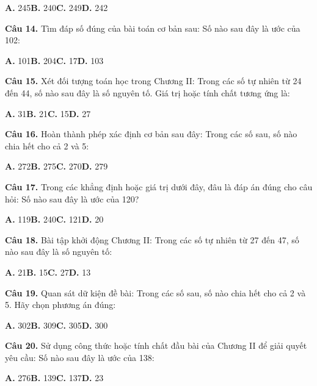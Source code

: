 \documentclass[11pt,a4paper]{article}
\begin{document}
\hspace*{1.5em}\textbf{A.} 245\quad\quad \textbf{B.} 240\quad\quad \textbf{C.} 249\quad\quad \textbf{D.} 242\par\vspace{2pt}
\textbf{\color{primary} Câu 14.} Tìm đáp số đúng của bài toán cơ bản sau: Số nào sau đây là ước của 102:\par
\hspace*{1.5em}\textbf{A.} 101\quad\quad \textbf{B.} 204\quad\quad \textbf{C.} 17\quad\quad \textbf{D.} 103\par\vspace{2pt}
\textbf{\color{primary} Câu 15.} Xét đối tượng toán học trong Chương II: Trong các số tự nhiên từ 24 đến 44, số nào sau đây là số nguyên tố. Giá trị hoặc tính chất tương ứng là:\par
\hspace*{1.5em}\textbf{A.} 31\quad\quad \textbf{B.} 21\quad\quad \textbf{C.} 15\quad\quad \textbf{D.} 27\par\vspace{2pt}
\textbf{\color{primary} Câu 16.} Hoàn thành phép xác định cơ bản sau đây: Trong các số sau, số nào chia hết cho cả 2 và 5:\par
\hspace*{1.5em}\textbf{A.} 272\quad\quad \textbf{B.} 275\quad\quad \textbf{C.} 270\quad\quad \textbf{D.} 279\par\vspace{2pt}
\textbf{\color{primary} Câu 17.} Trong các khẳng định hoặc giá trị dưới đây, đâu là đáp án đúng cho câu hỏi: Số nào sau đây là ước của 120?\par
\hspace*{1.5em}\textbf{A.} 119\quad\quad \textbf{B.} 240\quad\quad \textbf{C.} 121\quad\quad \textbf{D.} 20\par\vspace{2pt}
\textbf{\color{primary} Câu 18.} Bài tập khởi động Chương II: Trong các số tự nhiên từ 27 đến 47, số nào sau đây là số nguyên tố:\par
\hspace*{1.5em}\textbf{A.} 21\quad\quad \textbf{B.} 15\quad\quad \textbf{C.} 27\quad\quad \textbf{D.} 13\par\vspace{2pt}
\textbf{\color{primary} Câu 19.} Quan sát dữ kiện đề bài: Trong các số sau, số nào chia hết cho cả 2 và 5. Hãy chọn phương án đúng:\par
\hspace*{1.5em}\textbf{A.} 302\quad\quad \textbf{B.} 309\quad\quad \textbf{C.} 305\quad\quad \textbf{D.} 300\par\vspace{2pt}
\textbf{\color{primary} Câu 20.} Sử dụng công thức hoặc tính chất đầu bài của Chương II để giải quyết yêu cầu: Số nào sau đây là ước của 138:\par
\hspace*{1.5em}\textbf{A.} 276\quad\quad \textbf{B.} 139\quad\quad \textbf{C.} 137\quad\quad \textbf{D.} 23\par\vspace{2pt}
\end{document}
